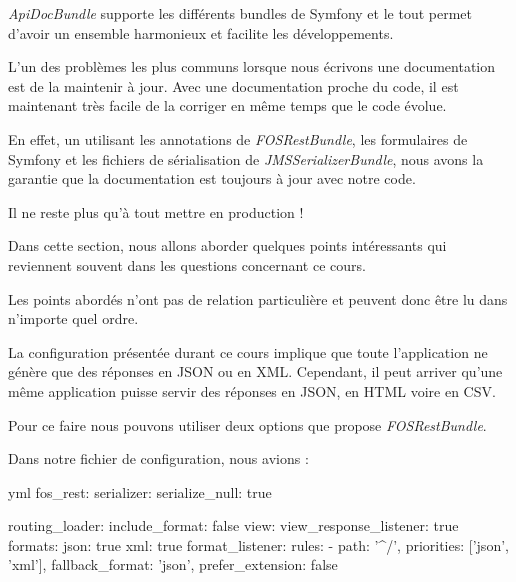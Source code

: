 \documentclass[big]{zmdocument}
\begin{document}
\horizontalLine



\textit{ApiDocBundle} supporte les différents bundles de Symfony et le tout permet d'avoir un ensemble harmonieux et facilite les développements.



L'un des problèmes les plus communs lorsque nous écrivons une documentation est de la maintenir à jour. Avec une documentation proche du code, il est maintenant très facile de la corriger en même temps que le code évolue.



En effet, un utilisant les annotations de \textit{FOSRestBundle}, les formulaires de Symfony et les fichiers de sérialisation de \textit{JMSSerializerBundle}, nous avons la garantie que la documentation est toujours à jour avec notre code.



Il ne reste plus qu'à tout mettre en production !





Dans cette section, nous allons aborder quelques points intéressants qui reviennent souvent dans les questions concernant ce cours.



Les points abordés n'ont pas de relation particulière et peuvent donc être lu dans n'importe quel ordre.





La configuration présentée durant ce cours implique que toute l'application ne génère que des réponses en JSON ou en XML. Cependant, il peut arriver qu'une même application puisse servir des réponses en JSON, en HTML voire en CSV.



Pour ce faire nous pouvons utiliser deux options que propose \textit{FOSRestBundle}.





Dans notre fichier de configuration, nous avions :



\begin{CodeBlock}{yml}
fos_rest:
    serializer:
        serialize_null:   true

    routing_loader:
        include_format: false
    view:
        view_response_listener: true
        formats:
            json: true
            xml: true
    format_listener:
        rules:
            - { path: '^/', priorities: ['json', 'xml'], fallback_format: 'json', prefer_extension: false }
\end{CodeBlock}
\end{document}
